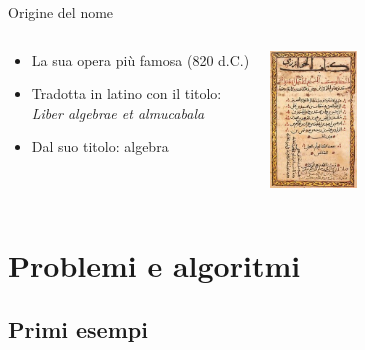 \begin{frame}[shrink=5]{Origine del nome}
\begin{overprint}
\begin{columns}[T]
\begin{myboxtitle}
\begin{itemize}
\item La sua opera più famosa (820 d.C.)
\item Tradotta in latino con il titolo:\\ \emph{Liber algebrae et almucabala}
\item Dal suo titolo: \alert{algebra}
\end{itemize}
\end{myboxtitle}
\begin{center}
\includegraphics[width=2.3cm]{algebra.jpg}
\end{center}
\end{columns}
\end{overprint}


\end{frame}

\section{Problemi e algoritmi}

\subsection{Primi esempi}

